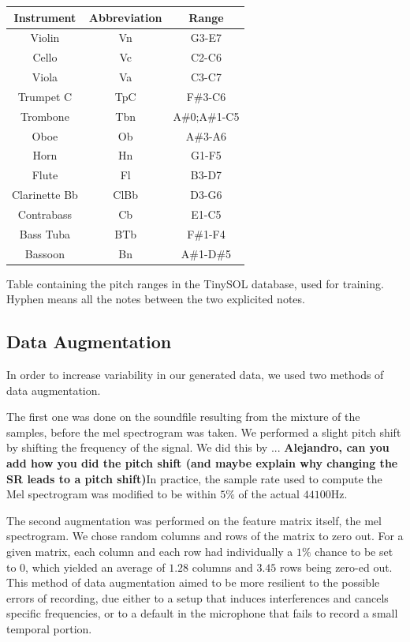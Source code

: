 \documentclass{article}
\begin{document}
\begin{table}
\begin{tabular}{|c|c|c|}
\hline
Instrument & Abbreviation & Range \\
\hline
Violin & Vn & G3-E7\\
Cello & Vc & C2-C6\\
Viola & Va & C3-C7\\
Trumpet C & TpC & F\#3-C6\\
Trombone & Tbn & A\#0;A\#1-C5\\
Oboe & Ob & A\#3-A6\\
Horn & Hn & G1-F5\\
Flute & Fl & B3-D7\\
Clarinette Bb & ClBb & D3-G6\\
Contrabass & Cb & E1-C5\\
Bass Tuba & BTb & F\#1-F4\\
Bassoon & Bn & A\#1-D\#5\\
\hline
\end{tabular}
\begin{caption}Table containing the pitch ranges in the TinySOL database, used for training. Hyphen means all the notes between the two explicited notes. \label{tab_pitch}
\end{caption}
\end{table}

\subsection{Data Augmentation}

In order to increase variability in our generated data, we used two methods of data augmentation.

The first one was done on the soundfile resulting from the mixture of the samples, before the mel spectrogram was taken. We performed a slight pitch shift by shifting the frequency of the signal. We did this by ... \textbf{Alejandro, can you add how you did the pitch shift (and maybe explain why changing the SR leads to a pitch shift)}In practice, the sample rate used to compute the Mel spectrogram was modified to be within $5\%$ of the actual $44100$Hz.

The second augmentation was performed on the feature matrix itself, the mel spectrogram. We chose random columns and rows of the matrix to zero out. For a given matrix, each column and each row had individually a $1\%$ chance to be set to 0, which yielded an average of $1.28$  columns and $3.45$ rows being zero-ed out. This method of data augmentation aimed to be more resilient to the possible errors of recording, due either to a setup that induces interferences and cancels specific frequencies, or to a default in the microphone that fails to record a small temporal portion.
\end{document}
